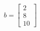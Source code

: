 \documentclass[preview]{standalone}
\begin{document}
\begin{align*}
b = \begin{bmatrix} 2 \\ 8 \\ 10 \end{bmatrix}
\end{align*}
\end{document}
